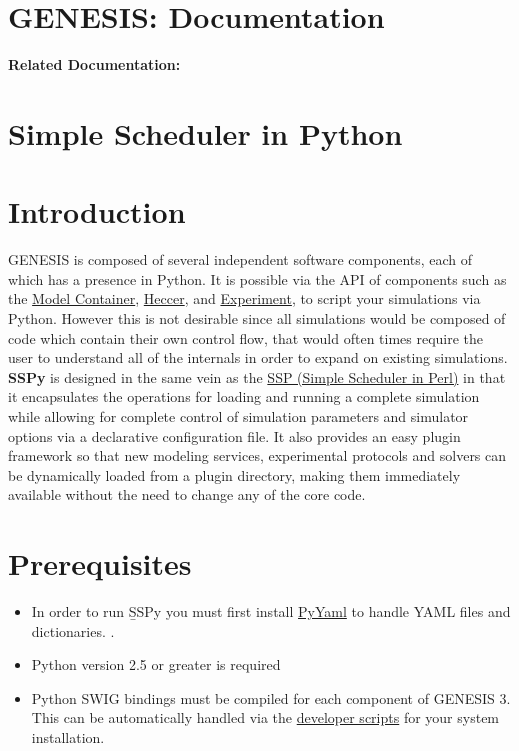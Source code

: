 \documentclass[12pt]{article}
\begin{document}
\section*{GENESIS: Documentation}

{\bf Related Documentation:}

\section*{Simple Scheduler in Python}

\section*{Introduction}

	GENESIS is composed of several independent software components, each of which has a presence in Python. It is possible via the API of components such as the \href{../model-container/model-container.tex}{Model Container}, \href{../heccer/heccer.tex}{Heccer}, and \href{../experiment/experiment.tex}{Experiment}, to script your simulations via Python. However this is not desirable since all simulations would be composed of code which contain their own control flow, that would often times require the user to understand all of the internals in order to expand on existing simulations. {\bf SSPy} is designed in the same vein as the \href{../ssp/ssp.tex}{SSP (Simple Scheduler in Perl)} in that it encapsulates the operations for loading and running a complete simulation while allowing for complete control of simulation parameters and simulator options via a declarative configuration file. It also provides an easy plugin framework so that new modeling services, experimental protocols and solvers can be dynamically loaded from a plugin directory, making them immediately available without the need to change any of the core code.  


\section*{Prerequisites}

\begin{itemize}
\item In order to run {\b SSPy} you must first install \href{http://pyyaml.org/}{PyYaml} to handle YAML files and dictionaries. .

\item Python version 2.5 or greater is required

\item Python SWIG bindings must be compiled for each component of GENESIS 3. This can be automatically handled via the \href{developer-installation/developer-installation.tex}{developer scripts} for your system installation.
\end{itemize}
\end{document}
